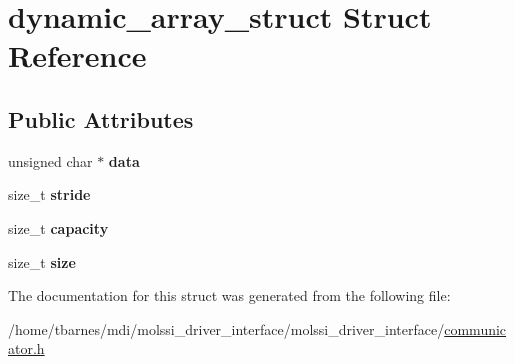 \hypertarget{structdynamic__array__struct}{\section{dynamic\-\_\-array\-\_\-struct Struct Reference}
\label{structdynamic__array__struct}
}
\subsection*{Public Attributes}
\begin{DoxyCompactItemize}
\item 
\hypertarget{structdynamic__array__struct_acdf8715c6be1adbb6ab128b47290df75}{unsigned char $\ast$ {\bfseries data}}\label{structdynamic__array__struct_acdf8715c6be1adbb6ab128b47290df75}

\item 
\hypertarget{structdynamic__array__struct_a954737a27d8650b96e8a7167545fc87c}{size\-\_\-t {\bfseries stride}}\label{structdynamic__array__struct_a954737a27d8650b96e8a7167545fc87c}

\item 
\hypertarget{structdynamic__array__struct_a0c21af687047cf2776e01e0c051f8da7}{size\-\_\-t {\bfseries capacity}}\label{structdynamic__array__struct_a0c21af687047cf2776e01e0c051f8da7}

\item 
\hypertarget{structdynamic__array__struct_a4c9b2cb6c298d0c5e63458e47ed7fb8e}{size\-\_\-t {\bfseries size}}\label{structdynamic__array__struct_a4c9b2cb6c298d0c5e63458e47ed7fb8e}

\end{DoxyCompactItemize}


The documentation for this struct was generated from the following file\-:\begin{DoxyCompactItemize}
\item 
/home/tbarnes/mdi/molssi\-\_\-driver\-\_\-interface/molssi\-\_\-driver\-\_\-interface/\hyperlink{communicator_8h}{communicator.\-h}\end{DoxyCompactItemize}
